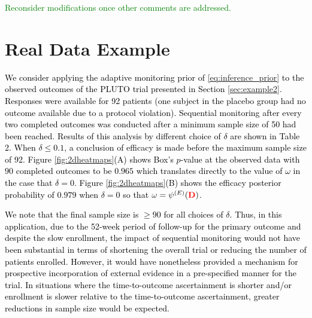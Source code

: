 \documentclass[12pt]{article}
\begin{document}
\textcolor{green}{
Reconsider modifications once other comments are addressed.
}
\section{Real Data Example}\label{sec:realdataexample}
\textcolor{black}{
We consider applying the adaptive monitoring prior of \eqref{eq:inference_prior} to the observed outcomes of the PLUTO trial presented in Section \ref{sec:example2}. %
Responses were available for 92 patients (one subject in the placebo group had no outcome available due to a protocol violation). Sequential monitoring after every two completed outcomes was conducted after a minimum sample size of 50 had been reached. Results of this analysis by different choice of $\delta$ are shown in Table 2. When $\delta\leq 0.1$, a conclusion of efficacy is made before the maximum sample size of 92. Figure \ref{fig:2dheatmaps}(A) shows Box's $p$-value at the observed data with $90$ completed outcomes to be $0.965$ which translates directly to the value of $\omega$ in the case that $\delta=0$. Figure \ref{fig:2dheatmaps}(B) shows the efficacy posterior probability of $0.979$ when $\delta=0$ so that $\omega=\psi^{(E)}(\textcolor{red}{\mathbf{D}})$.} 

\textcolor{black}{We note that the final sample size is $\ge 90$ for all choices of $\delta$. Thus, in this application, due to the 52-week period of follow-up for the primary outcome and despite the slow enrollment, the impact of sequential monitoring would not have been substantial in terms of shortening the overall trial or reducing the number of patients enrolled. However, it would have nonetheless provided a mechanism for prospective incorporation of external evidence in a pre-specified manner for the trial. In situations where the time-to-outcome ascertainment is shorter and/or enrollment is slower relative to the time-to-outcome ascertainment, greater reductions in sample size would be expected.}
\end{document}
